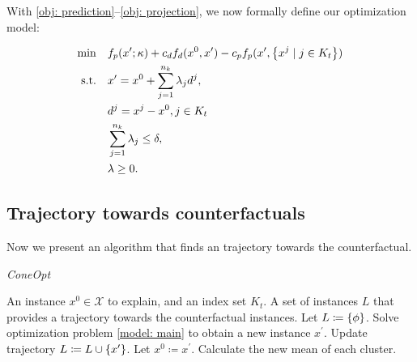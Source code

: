 With \eqref{obj: prediction}--\eqref{obj: projection}, we now formally define our optimization model:
 
\begin{subequations} \label{model: main}
\begin{align}
  \min \quad & f_p(x^\prime; \kappa) + c_{d} f_d(x^0, x^\prime) - c_{p} f_p(x^\prime, \left \{ x^j  \mid j \in K_t \right \}) \\
  \text{s.t.} \quad
       & x^\prime = x^0 + \sum_{j=1}^{n_k} \lambda_j d^j, \\
       & d^j = x^j - x^0, j \in K_t  \\
       & \sum_{j=1}^{n_k} \lambda_j \leq \delta, \\
       & \lambda \geq 0.
\end{align}
\end{subequations}


\subsection{Trajectory towards counterfactuals}
\label{subsec:Trajectory towards counterfactuals}

Now we present an algorithm that finds an trajectory towards the counterfactual. 

\begin{algorithm}[ht!]
\caption{\textit{ConeOpt}}
\label{algorithm:ConeOpt}
\begin{algorithmic}[1]
    \REQUIRE An instance $x^0 \in \mathcal{X}$ to explain, and an index set $K_t$.
    \ENSURE A set of instances $L$ that provides a trajectory towards the counterfactual instances.
    \STATE Let $L \coloneqq \left \{ \phi \right \}$.
        \STATE Solve optimization problem \eqref{model: main} to obtain a new instance $x^\prime$.
        	\STATE Update trajectory $L \coloneqq L \cup \left \{ x^\prime \right \}$.
        	\STATE Let $x^0 \coloneqq x^\prime$.
        \STATE Calculate the new mean of each cluster.
    \ENDWHILE
\end{algorithmic}
\end{algorithm}


